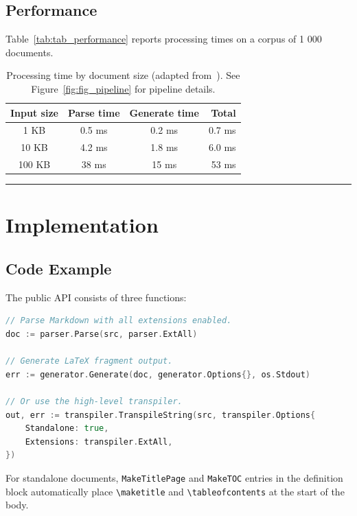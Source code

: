\documentclass{article}
\begin{document}
\subsection{Performance}

Table~\ref{tab:tab_performance} reports processing times on a corpus of 1 000 documents.

\begin{table}[h]
\centering
\caption{Processing time by document size (adapted from~\cite{knuth1986texbook}). See Figure~\ref{fig:fig_pipeline} for pipeline details.}
\begin{tabular}{cccr}
\toprule
Input size & Parse time & Generate time & Total \\
\midrule
1 KB & 0.5 ms & 0.2 ms & 0.7 ms \\
10 KB & 4.2 ms & 1.8 ms & 6.0 ms \\
100 KB & 38 ms & 15 ms & 53 ms \\
\bottomrule
\end{tabular}
\label{tab:tab\_performance}
\end{table}


\noindent\rule{\linewidth}{0.4pt}

\section{Implementation}

\subsection{Code Example}

The public API consists of three functions:

\begin{lstlisting}[language=go]
// Parse Markdown with all extensions enabled.
doc := parser.Parse(src, parser.ExtAll)

// Generate LaTeX fragment output.
err := generator.Generate(doc, generator.Options{}, os.Stdout)

// Or use the high-level transpiler.
out, err := transpiler.TranspileString(src, transpiler.Options{
    Standalone: true,
    Extensions: transpiler.ExtAll,
})
\end{lstlisting}

For standalone documents, \texttt{MakeTitlePage} and \texttt{MakeTOC} entries in the definition block automatically place \texttt{\textbackslash{}maketitle} and \texttt{\textbackslash{}tableofcontents} at the start of the body.
\end{document}
